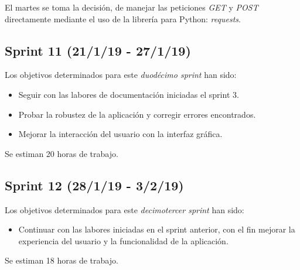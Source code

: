 El martes se toma la decisión, de manejar las peticiones \emph{GET} y \emph{POST} directamente mediante el uso de la librería para Python: \emph{requests}.
\subsection{Sprint 11 (21/1/19 - 27/1/19)}
Los objetivos determinados para este \emph{duodécimo sprint} han sido:
\begin{itemize}
	\item Seguir con las labores de documentación iniciadas el sprint 3.
	\item Probar la robustez de la aplicación y corregir errores encontrados.
	\item Mejorar la interacción del usuario con la interfaz gráfica.
\end{itemize}
Se estiman 20 horas de trabajo.

\subsection{Sprint 12 (28/1/19 - 3/2/19)}
Los objetivos determinados para este \emph{decimotercer sprint} han sido:
\begin{itemize}
	\item Continuar con las labores iniciadas en el sprint anterior, con el fin mejorar la experiencia del usuario y la funcionalidad de la aplicación.
\end{itemize}
Se estiman 18 horas de trabajo.

